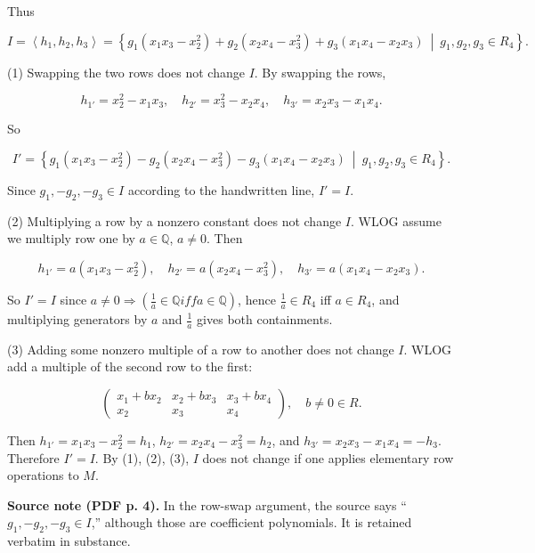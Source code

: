 Thus

\[I = \left\langle {h_{1},h_{2},h_{3}} \right\rangle = \left\{ g_{1}\left( {x_{1}x_{3} - x_{2}^{2}} \right) + g_{2}\left( {x_{2}x_{4} - x_{3}^{2}} \right) + g_{3}\left( {x_{1}x_{4} - x_{2}x_{3}} \right)\  \middle| \ g_{1},g_{2},g_{3} \in R_{4} \right\}.\]

(1) Swapping the two rows does not change \(I\). By swapping the rows,

\[h_{1'} = x_{2}^{2} - x_{1}x_{3},\quad h_{2'} = x_{3}^{2} - x_{2}x_{4},\quad h_{3'} = x_{2}x_{3} - x_{1}x_{4}.\]

So

\[I' = \left\{ g_{1}\left( {x_{1}x_{3} - x_{2}^{2}} \right) - g_{2}\left( {x_{2}x_{4} - x_{3}^{2}} \right) - g_{3}\left( {x_{1}x_{4} - x_{2}x_{3}} \right)\  \middle| \ g_{1},g_{2},g_{3} \in R_{4} \right\}.\]

Since \(g_{1}, - g_{2}, - g_{3} \in I\) according to the handwritten line, \(I' = I\).

(2) Multiplying a row by a nonzero constant does not change \(I\). WLOG assume we multiply row one by \(a \in \mathbb{Q}\), \(a \neq 0\). Then

\[h_{1'} = a\left( {x_{1}x_{3} - x_{2}^{2}} \right),\quad h_{2'} = a\left( {x_{2}x_{4} - x_{3}^{2}} \right),\quad h_{3'} = a\left( {x_{1}x_{4} - x_{2}x_{3}} \right).\]

So \(I' = I\) since \(a \neq 0\Rightarrow\left( {\frac{1}{a} \in \mathbb{Q}iffa \in \mathbb{Q}} \right)\), hence \(\frac{1}{a} \in R_{4}\) iff \(a \in R_{4}\), and multiplying generators by \(a\) and \(\frac{1}{a}\) gives both containments.

(3) Adding some nonzero multiple of a row to another does not change \(I\). WLOG add a multiple of the second row to the first:

\[\begin{pmatrix}
{x_{1} + bx_{2}} & {x_{2} + bx_{3}} & {x_{3} + bx_{4}} \\
x_{2} & x_{3} & x_{4}
\end{pmatrix},\quad b \neq 0 \in R.\]

Then \(h_{1'} = x_{1}x_{3} - x_{2}^{2} = h_{1}\), \(h_{2'} = x_{2}x_{4} - x_{3}^{2} = h_{2}\), and \(h_{3'} = x_{2}x_{3} - x_{1}x_{4} = - h_{3}\). Therefore \(I' = I\). By (1), (2), (3), \(I\) does not change if one applies elementary row operations to \(M\).

{\textbf{Source note (PDF p. 4).} In the row-swap argument, the source says ``\(g_{1}, - g_{2}, - g_{3} \in I\),'' although those are coefficient polynomials. It is retained verbatim in substance.}

